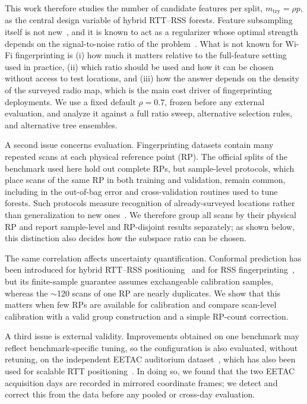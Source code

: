 This work therefore studies the number of candidate features per split, $m_{\mathrm{try}}=\rho p$, as the central design variable of hybrid RTT--RSS forests. Feature subsampling itself is not new~\cite{ho1998random,breiman2001random}, and it is known to act as a regularizer whose optimal strength depends on the signal-to-noise ratio of the problem~\cite{mentch2020randomization,probst2019hyperparameters}. What is not known for Wi-Fi fingerprinting is (i) how much it matters relative to the full-feature setting used in practice, (ii) which ratio should be used and how it can be chosen without access to test locations, and (iii) how the answer depends on the density of the surveyed radio map, which is the main cost driver of fingerprinting deployments. We use a fixed default $\rho=0.7$, frozen before any external evaluation, and analyze it against a full ratio sweep, alternative selection rules, and alternative tree ensembles.

A second issue concerns evaluation. Fingerprinting datasets contain many repeated scans at each physical reference point (RP). The official splits of the benchmark used here hold out complete RPs, but sample-level protocols, which place scans of the same RP in both training and validation, remain common, including in the out-of-bag error and cross-validation routines used to tune forests. Such protocols measure recognition of already-surveyed locations rather than generalization to new ones~\cite{roberts2017crossvalidation,wang2024domaininvariant,long2025multibuilding,narasimman2024dumbloc}. We therefore group all scans by their physical RP and report sample-level and RP-disjoint results separately; as shown below, this distinction also decides how the subspace ratio can be chosen.

The same correlation affects uncertainty quantification. Conformal prediction has been introduced for hybrid RTT--RSS positioning~\cite{feng2026robust} and for RSS fingerprinting~\cite{wang2023maploc,zhang2024rloc,ma2024navigating,nipa2025uncertainty,guo2026uegloc}, but its finite-sample guarantee assumes exchangeable calibration samples, whereas the $\sim$120 scans of one RP are nearly duplicates. We show that this matters when few RPs are available for calibration and compare scan-level calibration with a valid group construction and a simple RP-count correction.

A third issue is external validity. Improvements obtained on one benchmark may reflect benchmark-specific tuning, so the configuration is also evaluated, without retuning, on the independent EETAC auditorium dataset~\cite{martinescalona2023ftm}, which has also been used for scalable RTT positioning~\cite{gonzalezdiaz2026scalable}. In doing so, we found that the two EETAC acquisition days are recorded in mirrored coordinate frames; we detect and correct this from the data before any pooled or cross-day evaluation.

